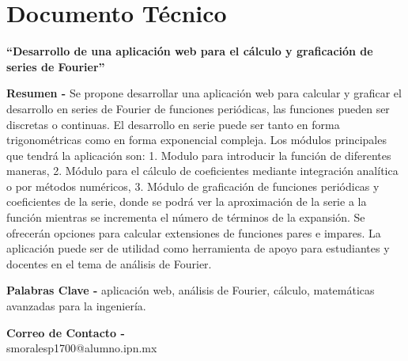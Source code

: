 \chapter{Documento Técnico}
\begin{center}
	\textbf{\Large “Desarrollo de una aplicación web para el cálculo y graficación de series de Fourier”}
	\vspace{0.5cm}
\end{center}

\textbf{Resumen -} Se propone desarrollar una aplicación web para calcular y graficar el desarrollo en series de Fourier de funciones periódicas, las funciones pueden ser discretas o continuas. El desarrollo en serie puede ser tanto en forma trigonométricas como en forma exponencial compleja. Los módulos principales que tendrá la aplicación son: 1. Modulo para introducir la función de diferentes maneras, 2. Módulo para el cálculo de coeficientes mediante integración analítica o por métodos numéricos, 3. Módulo de graficación de funciones periódicas y coeficientes de la serie, donde se podrá ver la aproximación de la serie a la función mientras se incrementa el número de términos de la expansión. Se ofrecerán opciones para calcular extensiones de funciones pares e impares. La aplicación puede ser de utilidad como herramienta de apoyo para estudiantes y docentes en
el tema de análisis de Fourier.

\vspace{0.5cm}

\textbf{Palabras Clave -} aplicación web, análisis de Fourier, cálculo, matemáticas avanzadas para la ingeniería.

\vspace{0.5cm}

\textbf{Correo de Contacto -} \\
smoralesp1700@alumno.ipn.mx \\